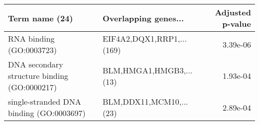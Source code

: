 \begin{tabular}{llr}
\toprule
                              Term name (24) &      Overlapping genes... &  Adjusted p-value \\
\midrule
                    RNA binding (GO:0003723) & EIF4A2,DQX1,RRP1,...(169) &          3.39e-06 \\
DNA secondary structure binding (GO:0000217) &   BLM,HMGA1,HMGB3,...(13) &          1.93e-04 \\
    single-stranded DNA binding (GO:0003697) &   BLM,DDX11,MCM10,...(23) &          2.89e-04 \\
\bottomrule
\end{tabular}
